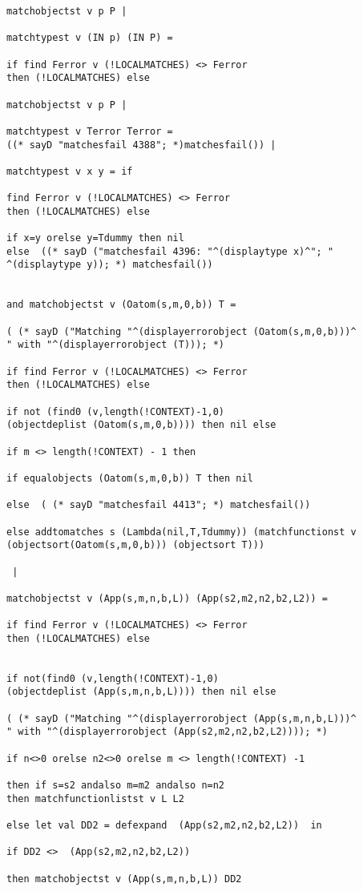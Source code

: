 \documentclass[12pt]{article}
\begin{document}
\begin{verbatim}
matchobjectst v p P |

matchtypest v (IN p) (IN P) = 

if find Ferror v (!LOCALMATCHES) <> Ferror 
then (!LOCALMATCHES) else

matchobjectst v p P |

matchtypest v Terror Terror = 
((* sayD "matchesfail 4388"; *)matchesfail()) |

matchtypest v x y = if 

find Ferror v (!LOCALMATCHES) <> Ferror 
then (!LOCALMATCHES) else

if x=y orelse y=Tdummy then nil 
else  ((* sayD ("matchesfail 4396: "^(displaytype x)^"; "
^(displaytype y)); *) matchesfail())


and matchobjectst v (Oatom(s,m,0,b)) T = 

( (* sayD ("Matching "^(displayerrorobject (Oatom(s,m,0,b)))^
" with "^(displayerrorobject (T))); *) 

if find Ferror v (!LOCALMATCHES) <> Ferror 
then (!LOCALMATCHES) else

if not (find0 (v,length(!CONTEXT)-1,0) 
(objectdeplist (Oatom(s,m,0,b)))) then nil else

if m <> length(!CONTEXT) - 1 then

if equalobjects (Oatom(s,m,0,b)) T then nil

else  ( (* sayD "matchesfail 4413"; *) matchesfail())

else addtomatches s (Lambda(nil,T,Tdummy)) (matchfunctionst v 
(objectsort(Oatom(s,m,0,b))) (objectsort T)))

 |

matchobjectst v (App(s,m,n,b,L)) (App(s2,m2,n2,b2,L2)) =

if find Ferror v (!LOCALMATCHES) <> Ferror 
then (!LOCALMATCHES) else


if not(find0 (v,length(!CONTEXT)-1,0) 
(objectdeplist (App(s,m,n,b,L)))) then nil else

( (* sayD ("Matching "^(displayerrorobject (App(s,m,n,b,L)))^
" with "^(displayerrorobject (App(s2,m2,n2,b2,L2)))); *)

if n<>0 orelse n2<>0 orelse m <> length(!CONTEXT) -1 

then if s=s2 andalso m=m2 andalso n=n2 
then matchfunctionlistst v L L2

else let val DD2 = defexpand  (App(s2,m2,n2,b2,L2))  in

if DD2 <>  (App(s2,m2,n2,b2,L2))  

then matchobjectst v (App(s,m,n,b,L)) DD2


\end{verbatim}
\end{document}
